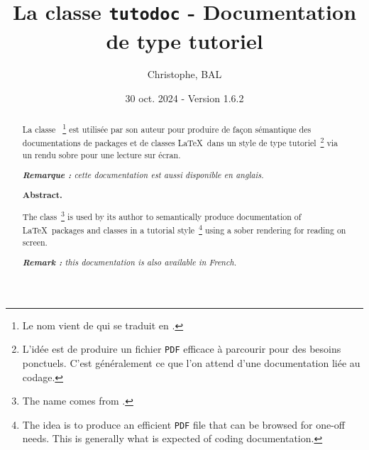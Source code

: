 \title{La classe \texttt{tutodoc} - Documentation de type tutoriel}
\author{Christophe, BAL}
\date{30 oct. 2024 - Version 1.6.2}

\maketitle


\begin{abstract}
    La classe \thisproj{}\,%
    \footnote{
        Le nom vient de  qui se traduit en .
    }
    est utilisée par son auteur pour produire de façon sémantique des documentations de packages et de classes \LaTeX\ dans un style de type tutoriel\,%
    \footnote{
        L'idée est de produire un fichier \texttt{PDF} efficace à parcourir pour des besoins ponctuels. C'est généralement ce que l'on attend d'une documentation liée au codage.
    }
    via un rendu sobre pour une lecture sur écran.

    \smallskip

    \noindent
    \emph{\textbf{Remarque :} cette documentation est aussi disponible en anglais.}

    \tdocsep

    {\small\itshape
        \vspace{-5pt}
        \begin{center}
            \textbf{Abstract.}
        \end{center}

        The \thisproj{} class\,%
        \footnote{
            The name comes from .
        }
        is used by its author to semantically produce documentation of \LaTeX\ packages and classes in a tutorial style\,%
        \footnote{
            The idea is to produce an efficient \texttt{PDF} file that can be browsed for one-off needs. This is generally what is expected of coding documentation.
        }
        using a sober rendering for reading on screen.

        \smallskip

        \noindent
        \emph{\textbf{Remark :} this documentation is also available in French.}
    }
\end{abstract}

\medskip

